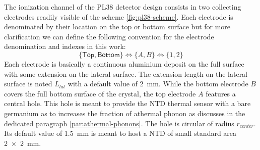 The ionization channel of the PL38 detector design consists in two collecting electrodes readily visible of the scheme \ref{fig:pl38-scheme}. Each electrode is denominated by their location on the top or bottom surface but for more clarification we can define the following convention for the electrode denomination and indexes in this work:
\begin{equation}
\label{eq:pl38-convention}
\lbrace \textsf{Top}, \textsf{Bottom} \rbrace
\Leftrightarrow 
\lbrace A, B \rbrace
\Leftrightarrow
\lbrace 1, 2 \rbrace
\end{equation}
Each electrode is basically a continuous aluminium deposit on the full surface with some extension on the lateral surface. The extension length on the lateral surface is noted $L_{lat}$ with a default value of \SI{2}{\mm}. While the bottom electrode $B$ covers the full bottom surface of the crystal, the top electrode $A$ features a central hole. This hole is meant to provide the NTD thermal sensor with a bare germanium as to increases the fraction of athermal phonon as discusses in the dedicated paragraph \ref{par:athermal-phonons}. The hole is circular of radius $r_{center}$. Its default value of \SI{1.5}{\mm} is meant to host a NTD of small standard area \SI{2 x 2}{\mm}.


